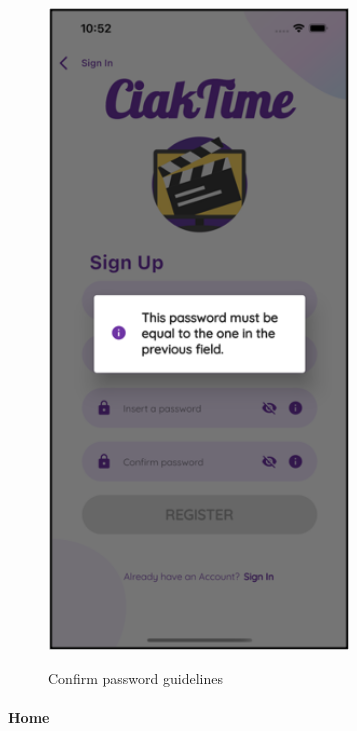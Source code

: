 \documentclass[12pt, a4paper]{article}
\numberwithin{figure}{section}
\begin{document}
\begin{center}
\begin{minipage}[t]{0.31\textwidth}
\begin{figure}[H]
			\includegraphics[width=0.71\textwidth]{images/prototype2/infoConfirmPass.png}\\
			\caption{Confirm password guidelines}
		\end{figure}
	\end{minipage}	
\end{center}

\paragraph{Home}
\end{document}
